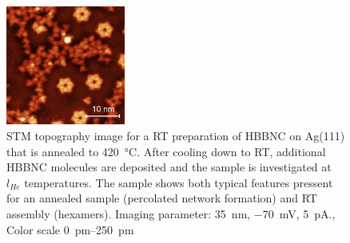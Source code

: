 
\begin{figure}[] \centering
	\includegraphics[width=0.35\textwidth]{./images/00239-180605-STM}
	\caption{STM topography image for a RT preparation of HBBNC on Ag(111) that is annealed to \SI{420}{\celsius}. After cooling down to RT, additional HBBNC molecules are deposited and the sample is investigated at $l_{He}$ temperatures. The sample shows both typical features pressent for an annealed sample (percolated network formation) and RT assembly (hexamers). Imaging parameter: \SI{35}{\nano \meter}, \SI{-70}{\milli \volt}, \SI{5}{\pico \ampere}., Color scale \SIrange{0}{250}{\pico \meter}}
	\label{fig:HBBNC-anneal-RT}
\end{figure}